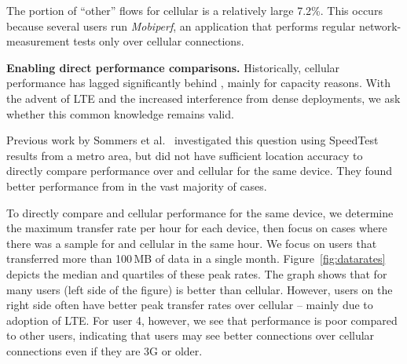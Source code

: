 The portion of ``other'' flows for cellular is a relatively large 7.2\%. This occurs because 
several users run \emph{Mobiperf}, an application that performs regular network-measurement 
tests only over cellular connections.


\noindent\textbf{Enabling direct performance comparisons.} 
Historically, cellular performance has lagged significantly behind 
\wifi, mainly for capacity reasons. With the advent of LTE and the 
increased interference from dense \wifi deployments, we ask whether 
this common knowledge remains valid. 

Previous work by Sommers et al.~\cite{sommers:cellwifi} investigated 
this question using SpeedTest results from a metro area, but did not 
have sufficient location accuracy to directly compare performance over 
\wifi and cellular for the same device. They found better performance 
from \wifi in the vast majority of cases. 

To directly compare \wifi and cellular performance for the same device, 
we determine the maximum transfer rate per hour for each device, 
then focus on cases where there was a sample for \wifi and cellular in 
the same hour. We focus on users that transferred more than 100\,MB of 
data in a single month. Figure~\ref{fig:datarates} depicts the median 
and quartiles of these peak rates. The graph shows that for many users 
(left side of the figure) \wifi is better than cellular. However, users on the right 
side often have better peak transfer rates over cellular -- mainly due to 
adoption of LTE. For user 4, however, we see that \wifi performance is 
poor compared to other users, indicating that users may see better 
connections over cellular connections even if they are 3G or older.

